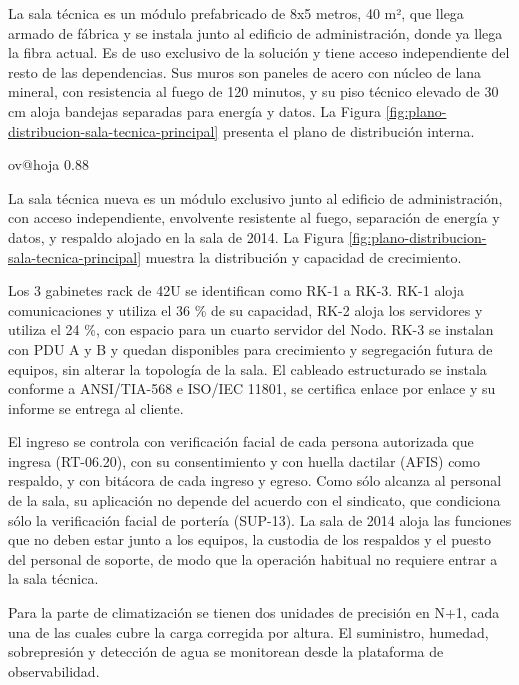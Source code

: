 \documentclass[subdoc]{../../comun/overfore}
\begin{document}
La sala técnica es un módulo prefabricado de 8x5 metros, 40 m², que llega armado de fábrica y se instala junto al edificio de administración, donde ya llega la fibra actual. Es de uso exclusivo de la solución y tiene acceso independiente del resto de las dependencias. Sus muros son paneles de acero con núcleo de lana mineral, con resistencia al fuego de 120 minutos, y su piso técnico elevado de 30 cm aloja bandejas separadas para energía y datos. La Figura \ref{fig:plano-distribucion-sala-tecnica-principal} presenta el plano de distribución interna.

\begin{horizontal}
\csname ov@hoja\endcsname{330.2mm}{215.9mm}
\expandafter\def\csname ov@altofig\endcsname{0.88}
\end{horizontal}
La sala técnica nueva es un módulo exclusivo junto al edificio de administración, con acceso independiente, envolvente resistente al fuego, separación de energía y datos, y respaldo alojado en la sala de 2014. La Figura \ref{fig:plano-distribucion-sala-tecnica-principal} muestra la distribución y capacidad de crecimiento.

Los 3 gabinetes rack de 42U se identifican como RK-1 a RK-3. RK-1 aloja comunicaciones y utiliza el 36 \% de su capacidad, RK-2 aloja los servidores y utiliza el 24 \%, con espacio para un cuarto servidor del Nodo. RK-3 se instalan con PDU A y B y quedan disponibles para crecimiento y segregación futura de equipos, sin alterar la topología de la sala. El cableado estructurado se instala conforme a ANSI/TIA-568 e ISO/IEC 11801, se certifica enlace por enlace y su informe se entrega al cliente.

El ingreso se controla con verificación facial de cada persona autorizada que ingresa (RT-06.20), con su consentimiento y con huella dactilar (AFIS) como respaldo, y con bitácora de cada ingreso y egreso. Como sólo alcanza al personal de la sala, su aplicación no depende del acuerdo con el sindicato, que condiciona sólo la verificación facial de portería (SUP-13). La sala de 2014 aloja las funciones que no deben estar junto a los equipos, la custodia de los respaldos y el puesto del personal de soporte, de modo que la operación habitual no requiere entrar a la sala técnica.

Para la parte de climatización se tienen dos unidades de precisión en N+1, cada una de las cuales cubre la carga corregida por altura. El suministro, humedad, sobrepresión y detección de agua se monitorean desde la plataforma de observabilidad.
\end{document}
